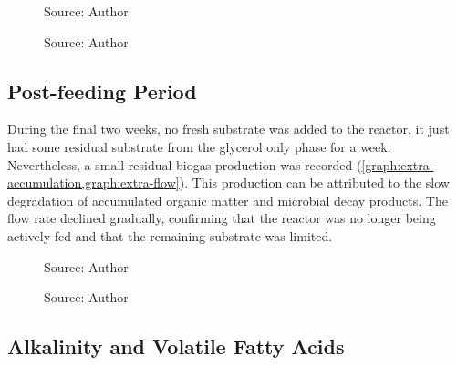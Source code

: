 \begin{figure}[H]
    \centering
    \caption{Source: Author}
    \label{graph:gl-flow}
\end{figure}

\begin{figure}[H]
    \centering
    \caption{Source: Author}
    \label{graph:gl-flow-30}
\end{figure}

\subsection{Post-feeding Period}
\label{subsec:post_feeding}

During the final two weeks, no fresh substrate was added to the reactor, it just had some residual substrate from the glycerol only phase for a week. Nevertheless, a small residual biogas production was recorded (\cref{graph:extra-accumulation,graph:extra-flow}). This production can be attributed to the slow degradation of accumulated organic matter and microbial decay products. The flow rate declined gradually, confirming that the reactor was no longer being actively fed and that the remaining substrate was limited.

\begin{figure}[H]
    \centering
    \caption{Source: Author}
    \label{graph:extra-accumulation}
\end{figure}

\begin{figure}[H]
    \centering
    \caption{Source: Author}
    \label{graph:extra-flow}
\end{figure}

\subsection{Alkalinity and Volatile Fatty Acids}
\label{subsec:alkalinity_vfa}

